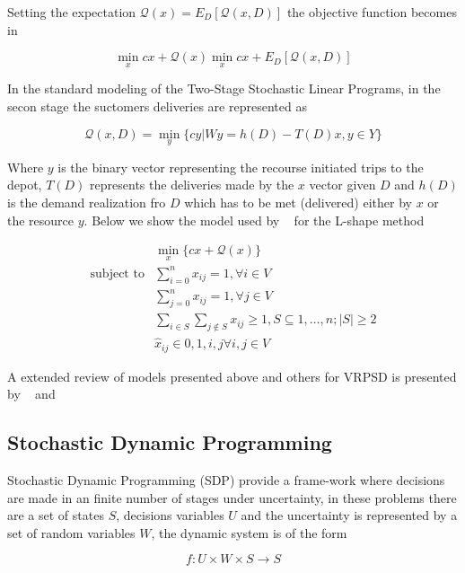 Setting the expectation $\mathcal{Q}(x) = E_D[\mathcal{Q}(x,D)]$ the objective function becomes in

\begin{equation}\label{eq:SPR_objective}
 \min\limits_x{cx+\mathcal{Q}(x)} \min\limits_x{cx+E_D[\mathcal{Q}(x,D)]}
\end{equation}

In the standard modeling of the Two-Stage Stochastic Linear Programs, in the secon stage the suctomers deliveries are represented as

\begin{equation}\label{eq:SPR_second_stage}
 \mathcal{Q}(x,D)=\min\limits_y\{cy|Wy=h(D)-T(D)x, y \in Y\}
\end{equation}

Where $y$ is the binary vector representing the recourse initiated trips to the depot, $T(D)$ represents the deliveries made by the $x$ vector given $D$ and $h(D)$ is the demand realization fro $D$ which has to be met (delivered) either by $x$ or the resource $y$. Below we show the model used by ~\cite{laporte_integer_2002} for the L-shape method

\begin{align}\label{eq:SPR_lshape}
  & \min\limits_{x} \{cx+\mathcal{Q}(x)\}\\ 
 \text{subject to} & \sum_{i=0}^nx_{ij} = 1, \forall i \in V\\
  & \sum_{j=0}^nx_{ij} = 1, \forall j \in V\\
  & \sum_{i\in S}\sum_{j\notin S}x_{ij} \geq 1, S\subseteq {1,\ldots,n};|S|\geq2\\
  & \hat{x}_{ij} \in {0,1}, i,j \forall i,j \in V
\end{align}

A extended review of models presented above and others for VRPSD is presented by ~\cite{Dror_2005} and ~\cite{Dror1993432}

\subsection{Stochastic Dynamic Programming}

Stochastic Dynamic Programming (SDP) provide a frame-work where decisions are made in an finite number of stages under uncertainty, in these problems there are a set of states $S$, decisions variables $U$ and the uncertainty is represented by a set of random variables $W$, the dynamic system is of the form

\[f: U\times W \times S \rightarrow S\]

